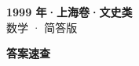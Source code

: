 \documentclass[zihao=-4, a4paper]{ctexart}
\begin{document}
\begin{center}
  {\Large\bfseries 1999 年·上海卷·文史类}\\[4pt]
  {\large 数学 · 简答版}
\end{center}
\medskip
{}

\clearpage
{}
\begin{center}{\Large\bfseries 答案速查}\end{center}
\medskip

\end{document}
